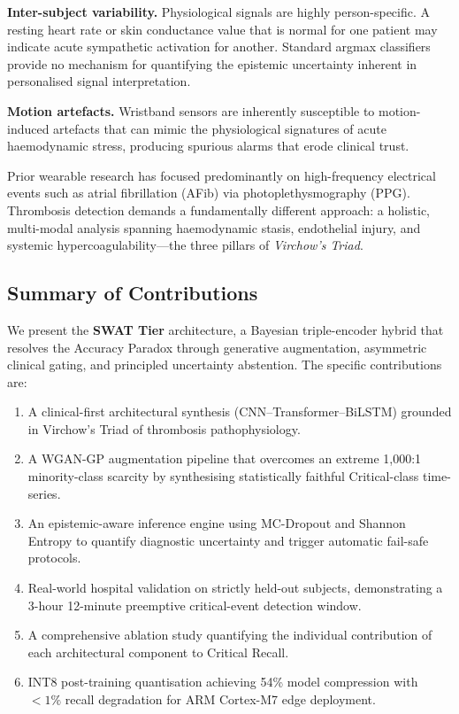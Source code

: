 \documentclass[conference]{IEEEtran}
\begin{document}
\textbf{Inter-subject variability.}  Physiological signals are
highly person-specific.  A resting heart rate or skin conductance value
that is normal for one patient may indicate acute sympathetic activation
for another.  Standard argmax classifiers provide no mechanism for
quantifying the epistemic uncertainty inherent in personalised signal
interpretation.

\textbf{Motion artefacts.}  Wristband sensors are inherently
susceptible to motion-induced artefacts that can mimic the
physiological signatures of acute haemodynamic stress, producing
spurious alarms that erode clinical trust.

Prior wearable research has focused predominantly on
high-frequency electrical events such as atrial fibrillation (AFib)
via photoplethysmography (PPG).  Thrombosis detection demands a
fundamentally different approach: a holistic, multi-modal analysis
spanning haemodynamic stasis, endothelial injury, and systemic
hypercoagulability---the three pillars of \textit{Virchow's Triad}.

\subsection{Summary of Contributions}
We present the \textbf{SWAT Tier} architecture, a Bayesian
triple-encoder hybrid that resolves the Accuracy Paradox through
generative augmentation, asymmetric clinical gating, and principled
uncertainty abstention.  The specific contributions are:

\begin{enumerate}
  \item A clinical-first architectural synthesis (CNN--Transformer--BiLSTM)
        grounded in Virchow's Triad of thrombosis pathophysiology.
  \item A WGAN-GP augmentation pipeline that overcomes an extreme
        1{,}000:1 minority-class scarcity by synthesising statistically
        faithful Critical-class time-series.
  \item An epistemic-aware inference engine using MC-Dropout and Shannon
        Entropy to quantify diagnostic uncertainty and trigger automatic
        fail-safe protocols.
  \item Real-world hospital validation on strictly held-out subjects,
        demonstrating a 3-hour 12-minute preemptive critical-event
        detection window.
  \item A comprehensive ablation study quantifying the individual
        contribution of each architectural component to Critical Recall.
  \item INT8 post-training quantisation achieving 54\% model compression
        with ${<}1\%$ recall degradation for ARM Cortex-M7 edge deployment.
\end{enumerate}
\end{document}
